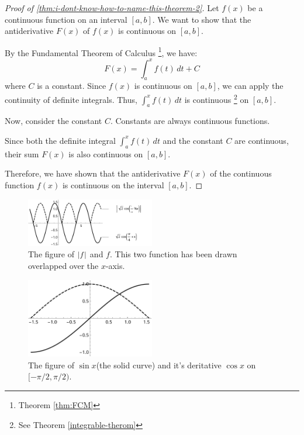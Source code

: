 \begin{proof}[Proof of \ref{thm:i-dont-know-how-to-name-this-theorem-2}]
    Let $f(x)$ be a continuous function on an interval $[a, b]$. 
    We want to show that the antiderivative $F(x)$ 
    of $f(x)$ is continuous on $[a, b]$.

    By the Fundamental Theorem of Calculus
    \footnote{Theorem \ref{thm:FCM}}, we have:
    \[F(x) = \int_{a}^{x} f(t) \, dt + C\]
    where $C$ is a constant. 
    Since $f(x)$ is continuous on $[a, b]$, 
    we can apply the continuity of definite integrals. 
    Thus, $\int_{a}^{x} f(t) \, dt$ is continuous
    \footnote{See Theorem \ref{integrable-therom}}
    on $[a, b]$.

    Now, consider the constant $C$. Constants 
    are always continuous functions.

    Since both the definite integral $\int_{a}^{x} f(t) \, dt$ 
    and the constant $C$ are continuous, their sum 
    $F(x)$ is also continuous on $[a, b]$.

    Therefore, we have shown that the antiderivative 
    $F(x)$ of the continuous function $f(x)$ is continuous 
    on the interval $[a, b]$.
\end{proof}

\begin{figure}
    \centering
    \includegraphics[width=0.5\textwidth]{figure/sqrt-2-cos-pi-slash-4-plus-x-with-without-abs.pdf}
    \caption{The figure of $\abs*{f}$ and $f$. This two function has been drawn overlapped over the $x$-axis.}
    \label{fig:sqrt-2-cos-pi-slash-4-plus-x-with-without-abs}
\end{figure}

\begin{figure}
    \centering
    \includegraphics[width=0.5\textwidth]{figure/sin-and-cos-in-some-interval.pdf}
    \caption{The figure of $\sin x$(the solid curve) and it's deritative $\cos x$ on $[-\pi /2, \pi/2)$. }
    \label{fig:sin-and-cos-in-some-interval}
\end{figure}

